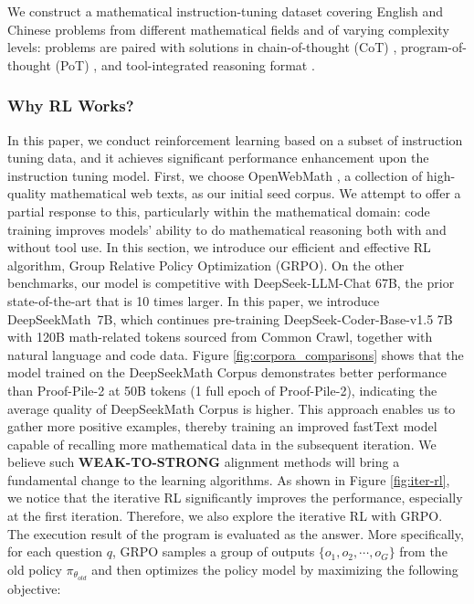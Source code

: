 \begin{algorithm}[t]
\begin{algorithmic}[1]
\begin{itemize}[topsep=0pt]
We construct a mathematical instruction-tuning dataset covering English and Chinese problems from different mathematical fields and of varying complexity levels: problems are paired with solutions in chain-of-thought (CoT) \citep{cot}, program-of-thought (PoT) \citep{pot,pal}, and tool-integrated reasoning format \citep{tora}. \subsubsection{Why RL Works?} In this paper, we conduct reinforcement learning based on a subset of instruction tuning data, and it achieves significant performance enhancement upon the instruction tuning model. First, we choose OpenWebMath \citep{openwebmath}, a collection of high-quality mathematical web texts, as our initial seed corpus. We attempt to offer a partial response to this, particularly within the mathematical domain: code training improves models' ability to do mathematical reasoning both with and without tool use. In this section, we introduce our efficient and effective RL algorithm, Group Relative Policy Optimization (GRPO). On the other benchmarks, our model is competitive with DeepSeek-LLM-Chat 67B, the prior state-of-the-art that is 10 times larger. In this paper, we introduce DeepSeekMath~7B, which continues pre-training DeepSeek-Coder-Base-v1.5 7B  with 120B math-related tokens sourced from Common Crawl, together with natural language and code data. Figure \ref{fig:corpora_comparisons} shows that the model trained on the DeepSeekMath Corpus demonstrates better performance than Proof-Pile-2 at 50B tokens (1 full epoch of Proof-Pile-2), indicating the average quality of DeepSeekMath Corpus is higher. This approach enables us to gather more positive examples, thereby training an improved fastText model capable of recalling more mathematical data in the subsequent iteration. We believe such \textbf{WEAK-TO-STRONG} \citep{burns2023weak} alignment methods will bring a fundamental change to the learning algorithms. As shown in Figure \ref{fig:iter-rl}, we notice that the iterative RL significantly improves the performance, especially at the first iteration. Therefore, we also explore the iterative RL with GRPO. The execution result of the program is evaluated as the answer. More specifically, for each question $q$, GRPO samples a group of outputs $\{o_1, o_2, \cdots, o_G\}$  from the old policy  $\pi_{\theta_{old}}$  and then optimizes the policy model by maximizing the following objective:


\end{itemize}
\end{algorithmic}
\end{algorithm}

